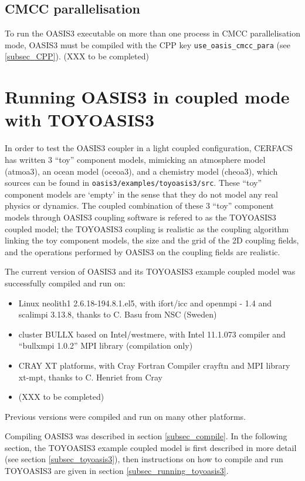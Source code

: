 \subsection{CMCC parallelisation}
\label{sec_cmccpara_mode}
To run the OASIS3 executable on more than one process in CMCC 
parallelisation mode, OASIS3 must be compiled with the CPP key 
{\tt use\_oasis\_cmcc\_para} (see \ref{subsec_CPP}). (XXX to be completed)

\section{Running OASIS3 in coupled mode with TOYOASIS3}
\label{sec_coupled_mode}

In order to test the OASIS3 coupler in a light coupled configuration,
CERFACS has written 3 ``toy'' component models, mimicking an
atmosphere model (atmoa3), an ocean model (oceoa3), and a
chemistry model (cheoa3), which sources can be found in
{\tt oasis3/examples/toyoasis3/src}. These ``toy'' component models
are `empty' in the sense that they do not model any real physics or
dynamics. The coupled combination of these 3 ``toy'' component models
through OASIS3 coupling software is refered to as the TOYOASIS3 coupled
model; the TOYOASIS3 coupling is realistic as the coupling algorithm
linking the toy component models, the size and the grid of the
2D coupling fields, and the operations performed by
OASIS3 on the coupling fields are realistic.

The current version of OASIS3 and its TOYOASIS3 example coupled model
was successfully compiled and run on:
\begin{itemize}
\item Linux neolith1 2.6.18-194.8.1.el5, with ifort/icc and openmpi -
  1.4 and scalimpi 3.13.8, thanks to C. Basu from NSC (Sweden)
\item cluster BULLX based on Intel/westmere, with Intel 11.1.073 compiler and ``bullxmpi 1.0.2'' MPI library (compilation only)
\item CRAY XT platforms, with Cray Fortran Compiler crayftn and MPI library xt-mpt, thanks to C. Henriet from Cray 
\item (XXX to be completed)
\end{itemize}
Previous versions were compiled and run on many other platforms.

Compiling OASIS3 was described in section \ref{subsec_compile}. In the
following section, the TOYOASIS3 example coupled model is first
described in more detail (see section \ref{subsec_toyoasis3}), then
instructions on how to compile and run TOYOASIS3 are given in section
\ref{subsec_running_toyoasis3}.

